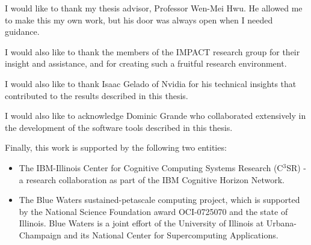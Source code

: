 I would like to thank my thesis advisor, Professor Wen-Mei Hwu.
He allowed me to make this my own work, but his door was always open when I needed guidance.

I would also like to thank the members of the IMPACT research group for their insight and assistance, and for creating such a fruitful research environment.

I would also like to thank Isaac Gelado of Nvidia for his technical insights that contributed to the results described in this thesis.

I would also like to acknowledge Dominic Grande who collaborated extensively in the development of the software tools described in this thesis.

Finally, this work is supported by the following two entities:
\begin{itemize}
    \item The IBM-Illinois Center for Cognitive Computing Systems Research (C$^3$SR) - a research collaboration as part of the IBM Cognitive Horizon Network.
    \item The Blue Waters sustained-petascale computing project, which is supported by the National Science Foundation award OCI-0725070 and the state of Illinois. 
Blue Waters is a joint effort of the University of Illinois at Urbana-Champaign and its National Center for Supercomputing Applications.
\end{itemize}